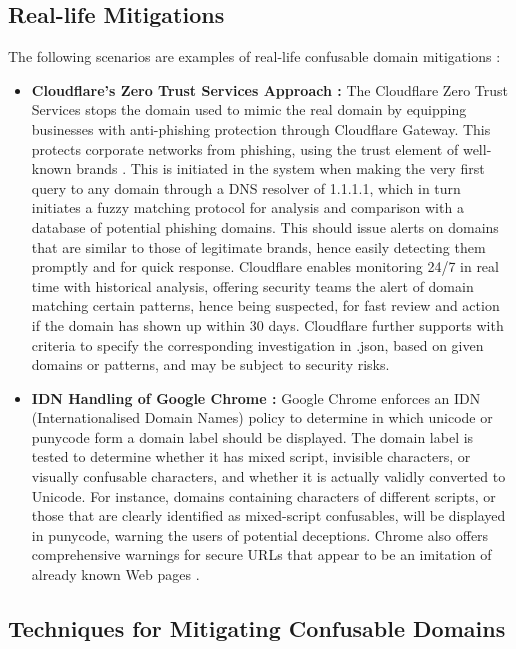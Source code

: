 \subsection{ Real-life Mitigations}

The following scenarios are examples of real-life confusable domain mitigations :

\begin{itemize}
    \item \textbf{Cloudflare's Zero Trust Services Approach :} The Cloudflare Zero Trust Services stops the domain used to mimic the real domain by equipping businesses with anti-phishing protection through Cloudflare Gateway. This protects corporate networks from phishing, using the trust element of well-known brands \cite{Cloudflare2023}. This is initiated in the system when making the very first query to any domain through a DNS resolver of 1.1.1.1, which in turn initiates a fuzzy matching protocol for analysis and comparison with a database of potential phishing domains. This should issue alerts on domains that are similar to those of legitimate brands, hence easily detecting them promptly and for quick response. Cloudflare enables monitoring 24/7 in real time with historical analysis, offering security teams the alert of domain matching certain patterns, hence being suspected, for fast review and action if the domain has shown up within 30 days. Cloudflare further supports with criteria to specify the corresponding investigation in .json, based on given domains or patterns, and may be subject to security risks.

     \item \textbf{IDN Handling of Google Chrome : }Google Chrome enforces an IDN (Internationalised Domain Names) policy to determine in which unicode or punycode form a domain label should be displayed. The domain label is tested to determine whether it has mixed script, invisible characters, or visually confusable characters, and whether it is actually validly converted to Unicode. For instance, domains containing characters of different scripts, or those that are clearly identified as mixed-script confusables, will be displayed in punycode, warning the users of potential deceptions. Chrome also offers comprehensive warnings for secure URLs that appear to be an imitation of already known Web pages \cite{ChromiumIDN}.
     
\end{itemize}

\subsection{Techniques for Mitigating Confusable Domains}

